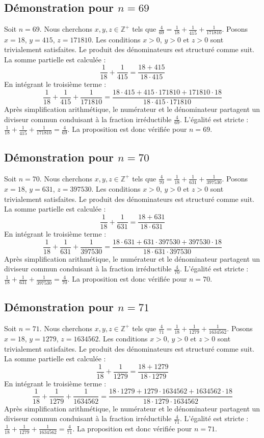 \documentclass[11pt,a4paper]{article}
\begin{document}
\subsection{Démonstration pour $n = 69$}
Soit $n = 69$. Nous cherchons $x, y, z \in \mathbb{Z}^{+}$ tels que $\frac{4}{69} = \frac{1}{18} + \frac{1}{415} + \frac{1}{171810}$.
Posons $x = 18$, $y = 415$, $z = 171810$.
Les conditions $x > 0$, $y > 0$ et $z > 0$ sont trivialement satisfaites.
Le produit des dénominateurs est structuré comme suit. La somme partielle est calculée :
$$ \frac{1}{18} + \frac{1}{415} = \frac{18+415}{18 \cdot 415} $$
En intégrant le troisième terme :
$$ \frac{1}{18} + \frac{1}{415} + \frac{1}{171810} = \frac{18 \cdot 415 + 415 \cdot 171810 + 171810 \cdot 18}{18 \cdot 415 \cdot 171810} $$
Après simplification arithmétique, le numérateur et le dénominateur partagent un diviseur commun conduisant à la fraction irréductible $\frac{4}{69}$.
L'égalité est stricte : $\frac{1}{18} + \frac{1}{415} + \frac{1}{171810} = \frac{4}{69}$.
La proposition est donc vérifiée pour $n = 69$.
\subsection{Démonstration pour $n = 70$}
Soit $n = 70$. Nous cherchons $x, y, z \in \mathbb{Z}^{+}$ tels que $\frac{4}{70} = \frac{1}{18} + \frac{1}{631} + \frac{1}{397530}$.
Posons $x = 18$, $y = 631$, $z = 397530$.
Les conditions $x > 0$, $y > 0$ et $z > 0$ sont trivialement satisfaites.
Le produit des dénominateurs est structuré comme suit. La somme partielle est calculée :
$$ \frac{1}{18} + \frac{1}{631} = \frac{18+631}{18 \cdot 631} $$
En intégrant le troisième terme :
$$ \frac{1}{18} + \frac{1}{631} + \frac{1}{397530} = \frac{18 \cdot 631 + 631 \cdot 397530 + 397530 \cdot 18}{18 \cdot 631 \cdot 397530} $$
Après simplification arithmétique, le numérateur et le dénominateur partagent un diviseur commun conduisant à la fraction irréductible $\frac{4}{70}$.
L'égalité est stricte : $\frac{1}{18} + \frac{1}{631} + \frac{1}{397530} = \frac{4}{70}$.
La proposition est donc vérifiée pour $n = 70$.
\subsection{Démonstration pour $n = 71$}
Soit $n = 71$. Nous cherchons $x, y, z \in \mathbb{Z}^{+}$ tels que $\frac{4}{71} = \frac{1}{18} + \frac{1}{1279} + \frac{1}{1634562}$.
Posons $x = 18$, $y = 1279$, $z = 1634562$.
Les conditions $x > 0$, $y > 0$ et $z > 0$ sont trivialement satisfaites.
Le produit des dénominateurs est structuré comme suit. La somme partielle est calculée :
$$ \frac{1}{18} + \frac{1}{1279} = \frac{18+1279}{18 \cdot 1279} $$
En intégrant le troisième terme :
$$ \frac{1}{18} + \frac{1}{1279} + \frac{1}{1634562} = \frac{18 \cdot 1279 + 1279 \cdot 1634562 + 1634562 \cdot 18}{18 \cdot 1279 \cdot 1634562} $$
Après simplification arithmétique, le numérateur et le dénominateur partagent un diviseur commun conduisant à la fraction irréductible $\frac{4}{71}$.
L'égalité est stricte : $\frac{1}{18} + \frac{1}{1279} + \frac{1}{1634562} = \frac{4}{71}$.
La proposition est donc vérifiée pour $n = 71$.
\end{document}
